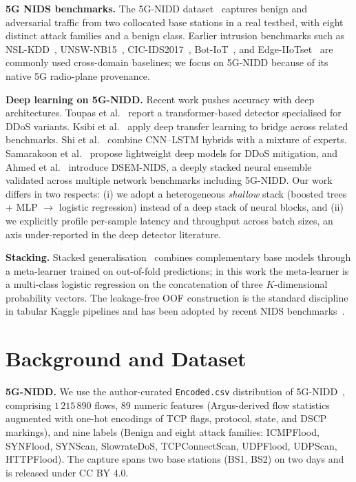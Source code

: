 \documentclass[conference]{IEEEtran}
\begin{document}
\textbf{5G NIDS benchmarks.} The 5G-NIDD dataset~\cite{samarakoon2022_5gnidd}
captures benign and adversarial traffic from two collocated base stations
in a real testbed, with eight distinct attack families and a benign
class. Earlier intrusion benchmarks such as NSL-KDD~\cite{hettich1999_kddcup99},
UNSW-NB15~\cite{moustafa2015_unswnb15}, CIC-IDS2017~\cite{sharafaldin2018_cicids2017},
Bot-IoT~\cite{koroniotis2019_bot_iot}, and Edge-IIoTset~\cite{ferrag2022_edgeiiotset}
are commonly used cross-domain baselines; we focus on 5G-NIDD because of
its native 5G radio-plane provenance.

\textbf{Deep learning on 5G-NIDD.} Recent work pushes accuracy with deep
architectures. Toupas et al.~\cite{toupas2025_deeptransids} report a
transformer-based detector specialised for DDoS variants. Ksibi et
al.~\cite{ksibi2024_dtl5g} apply deep transfer learning to bridge across
related benchmarks. Shi et al.~\cite{shi2024_5g_ddos_cnn_lstm} combine
CNN--LSTM hybrids with a mixture of experts. Samarakoon et
al.~\cite{samarakoon2025_lightweight_5gddos} propose lightweight deep
models for DDoS mitigation, and Ahmed et al.~\cite{ahmed2023_dsem}
introduce DSEM-NIDS, a deeply stacked neural ensemble validated across
multiple network benchmarks including 5G-NIDD. Our work differs in two
respects: (i) we adopt a heterogeneous \emph{shallow} stack (boosted
trees + MLP $\rightarrow$ logistic regression) instead of a deep stack
of neural blocks, and (ii) we explicitly profile per-sample latency and
throughput across batch sizes, an axis under-reported in the deep
detector literature.

\textbf{Stacking.} Stacked generalisation~\cite{wolpert1992_stacked,
breiman1996_stacked_reg} combines complementary base models through a
meta-learner trained on out-of-fold predictions; in this work the
meta-learner is a multi-class logistic regression on the concatenation
of three $K$-dimensional probability vectors. The leakage-free OOF
construction is the standard discipline in tabular Kaggle pipelines and
has been adopted by recent NIDS benchmarks~\cite{kunang2024_lightweight_edge}.

\section{Background and Dataset}
\label{sec:background}

\textbf{5G-NIDD.} We use the author-curated \texttt{Encoded.csv}
distribution of 5G-NIDD~\cite{siriwardhana2025_5gnidd_iddd}, comprising
$1\,215\,890$ flows, 89 numeric features (Argus-derived flow statistics
augmented with one-hot encodings of TCP flags, protocol, state, and DSCP
markings), and nine labels (Benign and eight attack families:
ICMPFlood, SYNFlood, SYNScan, SlowrateDoS, TCPConnectScan, UDPFlood,
UDPScan, HTTPFlood). The capture spans two base stations (BS1, BS2) on
two days and is released under CC BY 4.0.
\end{document}

